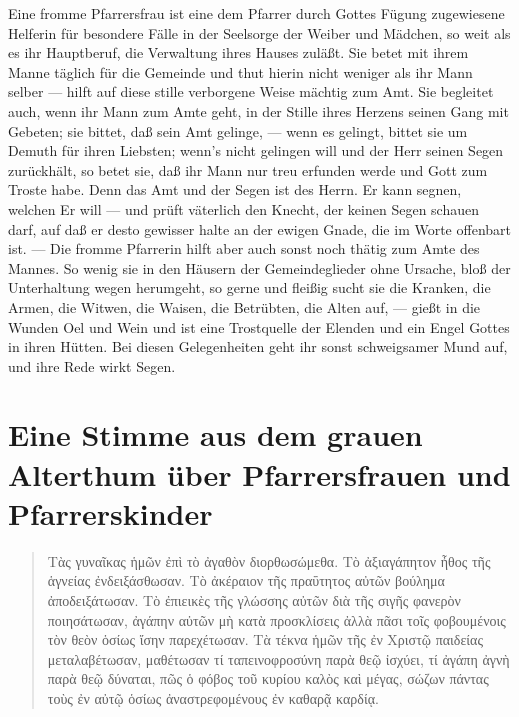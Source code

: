 Eine fromme Pfarrersfrau ist eine dem Pfarrer durch Gottes Fügung zugewiesene Helferin für besondere Fälle in der Seelsorge der Weiber und Mädchen, so weit als es ihr Hauptberuf, die Verwaltung ihres Hauses zuläßt. Sie betet mit ihrem Manne täglich für die Gemeinde und thut hierin nicht weniger als ihr Mann selber — hilft auf diese stille verborgene Weise
mächtig zum Amt. Sie begleitet auch, wenn ihr Mann zum Amte geht, in der Stille ihres Herzens seinen Gang mit Gebeten; sie bittet, daß sein Amt gelinge, — wenn es gelingt, bittet sie um Demuth für ihren Liebsten; wenn’s nicht gelingen will und der Herr seinen Segen zurückhält, so betet sie, daß ihr Mann nur treu erfunden werde und Gott zum Troste habe. Denn das Amt und der Segen ist des Herrn. Er kann segnen, welchen Er will — und prüft väterlich den Knecht, der keinen Segen schauen darf, auf daß er desto gewisser halte an der ewigen Gnade, die im Worte offenbart ist. — Die fromme Pfarrerin hilft aber auch sonst noch thätig zum Amte des Mannes. So wenig sie in den Häusern der Gemeindeglieder ohne Ursache, bloß der Unterhaltung wegen herumgeht, so gerne und fleißig sucht sie die Kranken, die Armen, die Witwen, die Waisen, die Betrübten, die Alten auf, — gießt in die Wunden Oel und Wein und ist eine Trostquelle der Elenden und ein Engel Gottes in ihren Hütten. Bei diesen Gelegenheiten geht ihr sonst schweigsamer Mund auf, und ihre Rede wirkt Segen.

\chapter[Eine Stimme aus dem grauen Alterthum]{Eine Stimme aus dem grauen Alterthum über Pfarrersfrauen und Pfarrerskinder}

\begin{quote}
Τὰς γυναῖκας ἡμῶν ἐπὶ τὸ ἀγαθὸν διορθωσώμεθα. Τὸ ἀξιαγάπητον ἦθος τῆς ἁγνείας ἐνδειξάσθωσαν. Τὸ ἀκέραιον τῆς πραΰτητος αὐτῶν βούλημα ἀποδειξάτωσαν. Τὸ ἐπιεικὲς τῆς γλώσσης αὐτῶν διὰ τῆς σιγῆς φανερὸν ποιησάτωσαν, ἀγάπην αὐτῶν μὴ κατὰ προσκλίσεις ἀλλὰ πᾶσι τοῖς φοβουμένοις τὸν θεὸν ὁσίως ἴσην παρεχέτωσαν. Τὰ τέκνα ἡμῶν τῆς ἐν Χριστῷ παιδείας μεταλαβέτωσαν, μαθέτωσαν τί ταπεινοφροσύνη παρὰ θεῷ ἰσχύει, τί ἀγάπη ἀγνὴ παρὰ θεῷ δύναται, πῶς ὁ φόβος τοῦ κυρίου καλὸς καὶ μέγας, σώζων πάντας τοὺς ἐν αὐτῷ ὁσίως ἀναστρεφομένους ἐν καθαρᾷ καρδίᾳ.
\end{quote}


